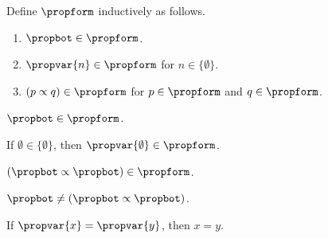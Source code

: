 \begin{datatype}\label{propform}
    Define $\propform$ inductively as follows.
    \begin{enumerate}
        \item $\propbot \in \propform$.
        \item $\propvar{n} \in \propform$ for $n \in \{\emptyset\}$.
        \item $(p \propto q) \in \propform$ for $p \in \propform$ and $q \in \propform$.
    \end{enumerate}
\end{datatype}

\begin{proposition}\label{propform_bot_test}
    $\propbot \in \propform$.
\end{proposition}

\begin{proposition}\label{propform_var_test}
    If $\emptyset \in \{\emptyset\}$, then $\propvar{\emptyset} \in \propform$.
\end{proposition}

\begin{proposition}\label{propform_imp_test}
    $(\propbot \propto \propbot) \in \propform$.
\end{proposition}

\begin{proposition}\label{propform_distinct_test}
    $\propbot \neq (\propbot \propto \propbot)$.
\end{proposition}

\begin{proposition}\label{propform_injective_test}
    If $\propvar{x} = \propvar{y}$, then $x = y$.
\end{proposition}
